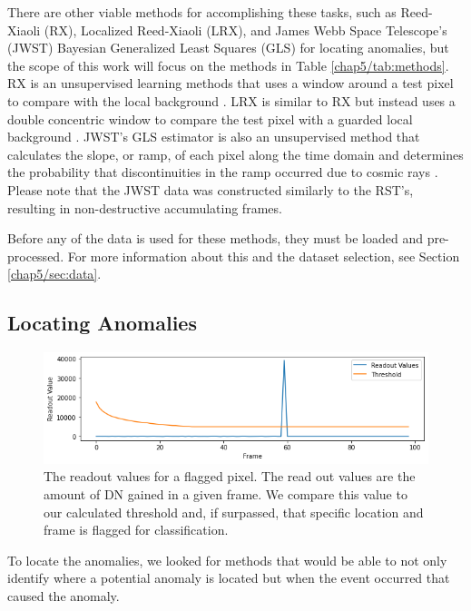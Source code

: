 There are other viable methods for accomplishing these tasks, such as Reed-Xiaoli (RX), Localized Reed-Xiaoli (LRX), and James Webb Space Telescope's (JWST) Bayesian Generalized Least Squares (GLS) for locating anomalies, but the scope of this work will focus on the methods in Table \ref{chap5/tab:methods}.
RX is an unsupervised learning methods that uses a window around a test pixel to compare with the local background \cite{reed1990adaptive}.
LRX is similar to RX but instead uses a double concentric window to compare the test pixel with a guarded local background \cite{molero2013analysis}.
JWST's GLS estimator is also an unsupervised method that calculates the slope, or ramp, of each pixel along the time domain and determines the probability that discontinuities in the ramp occurred due to cosmic rays \cite{robberto2015cr}.
Please note that the JWST data was constructed similarly to the RST's, resulting in non-destructive accumulating frames. 

Before any of the data is used for these methods, they must be loaded and pre-processed.
For more information about this and the dataset selection, see Section \ref{chap5/sec:data}.

\subsection{Locating Anomalies}
\begin{figure}[b]
    \centering
    \includegraphics[width=1\linewidth]{figs/5/Threshold.png}
    \caption{The readout values for a flagged pixel. The read out values are the amount of DN gained in a given frame. We compare this value to our calculated threshold and, if surpassed, that specific location and frame is flagged for classification.}
    \label{chap5/fig:threshold}
\end{figure}
To locate the anomalies, we looked for methods that would be able to not only identify where a potential anomaly is located but when the event occurred that caused the anomaly. 
